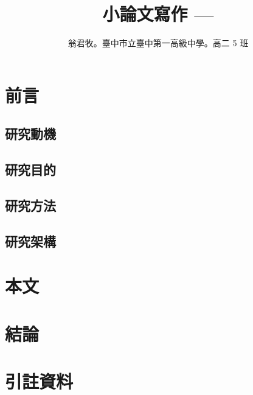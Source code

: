 \documentclass{essay}
\title{小論文寫作 --- }
\author{翁君牧。臺中市立臺中第一高級中學。高二 5 班}
\begin{document}
	
\maketitle

\section{前言}
\subsection{研究動機}

\subsection{研究目的}

\subsubsection{}

\subsubsection{}

\subsubsection{}

\subsection{研究方法}

\subsubsection{}

\subsubsection{}

\subsection{研究架構}

\section{本文}

\section{結論}

\section{引註資料}
\end{document}
